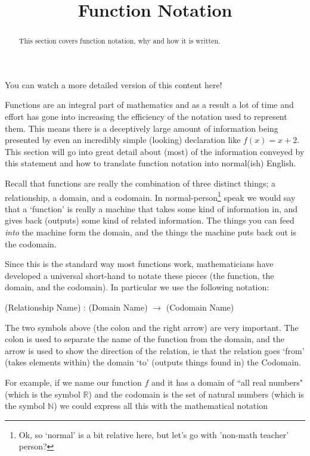 \documentclass{ximera}
\title{Function Notation}
\begin{document}
\begin{abstract}
    This section covers function notation, why and how it is written.
\end{abstract}
\maketitle

You can watch a more detailed version of this content here!


Functions are an integral part of mathematics and as a result a lot of time and effort has gone into increasing the efficiency of the notation used to represent them. This means there is a deceptively large amount of information being presented by even an incredibly simple (looking) declaration like $f(x) = x + 2$. This section will go into great detail about (most) of the information conveyed by this statement and how to translate function notation into normal(ish) English.

Recall that functions are really the combination of three distinct things; a relationship, a domain, and a codomain. In normal-person\footnote{
    Ok, so `normal' is a bit relative here, but let's go with 'non-math teacher' person?
        }
speak we would say that a `function' is really a machine that takes some kind of information in, and gives back (outputs) some kind of related information. The things you can feed \textit{into} the machine form the domain, and the things the machine puts back out is the codomain.

Since this is the standard way most functions work, mathematicians have developed a universal short-hand to notate these pieces (the function, the domain, and the codomain). In particular we use the following notation:

\begin{center}
    (Relationship Name) : (Domain Name) $\rightarrow$ (Codomain Name)
\end{center}

The two symbols above (the colon and the right arrow) are very important. The colon is used to separate the name of the function from the domain, and the arrow is used to show the direction of the relation, ie that the relation goes `from' (takes elements within) the domain `to' (outputs things found in) the Codomain.

For example, if we name our function $f$ and it has a domain of ``all real numbers" (which is the symbol $\mathbb{R}$) and the codomain is the set of natural numbers (which is the symbol $\mathbb{N}$) we could express all this with the mathematical notation
\end{document}

